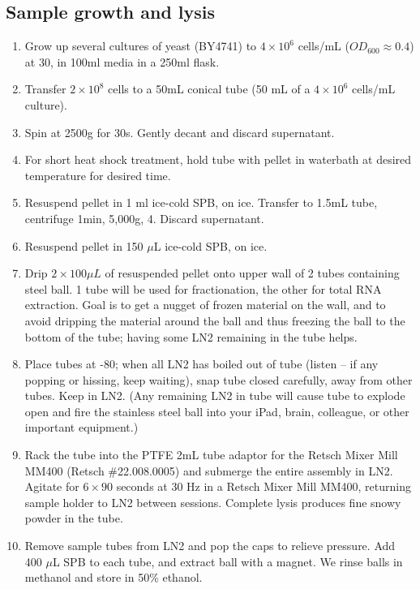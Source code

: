 \documentclass{article}
\newcommand{\mul}{\ensuremath{\mu}L\xspace}
\newcommand{\degC}{\celsius\xspace}
\begin{document}
\subsection*{Sample growth and lysis}
\begin{enumerate}[resume]
\item Grow up several cultures of yeast (BY4741) to $4 \times 10^6$ cells/mL ($OD_{600} \approx 0.4$) at 30\degC, in 100ml media in a 250ml flask. 
%
\item Transfer $2 \times 10^8$ cells to a 50mL conical tube (50 mL of a $4 \times 10^6$ cells/mL culture). 
\item Spin at 2500g for 30s. Gently decant and discard supernatant.
\item For short heat shock treatment, hold tube with pellet in waterbath at desired temperature for desired time. 
\item Resuspend pellet in 1 ml  ice-cold SPB, on ice. Transfer to 1.5mL tube, centrifuge 1min, 5,000g, 4\degC. Discard supernatant.
\item Resuspend pellet in 150 \mul  ice-cold SPB, on ice.
\item Drip $2 \times 100\mul$  of resuspended pellet onto upper wall of 2 tubes containing steel ball. 1 tube will be used for fractionation, the other for total RNA extraction. Goal is to get a nugget of frozen material on the wall, and to avoid dripping the material around the ball and thus freezing the ball to the bottom of the tube; having some LN2 remaining in the tube helps.
\item Place tubes at -80\degC; when all LN2 has boiled out of tube (listen -- if any popping or hissing, keep waiting), snap tube closed carefully, away from other tubes. Keep in LN2. (Any remaining LN2 in tube will cause tube to explode open and fire the stainless steel ball into your iPad, brain, colleague, or other important equipment.)
\item Rack the tube into the PTFE 2mL tube adaptor for the Retsch Mixer Mill MM400 (Retsch \#22.008.0005) and submerge the entire assembly in LN2.
Agitate for $6 \times 90$ seconds at 30 Hz in a Retsch Mixer Mill MM400, returning sample holder to LN2 between sessions. Complete lysis produces fine snowy powder in the tube.
\item Remove sample tubes from LN2 and pop the caps to relieve pressure. Add 400 \mul SPB to each tube, and extract ball with a magnet. We rinse balls in methanol and store in 50\% ethanol. 
\end{enumerate}
\end{document}
